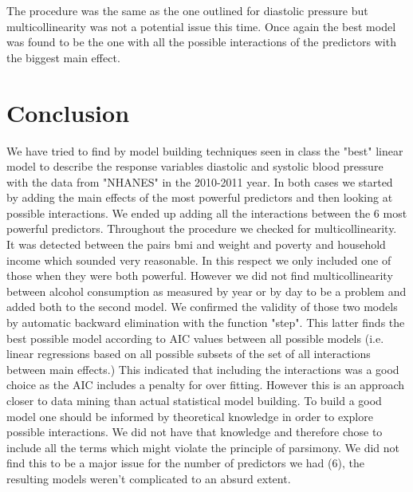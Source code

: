 \documentclass{article}\usepackage[]{graphicx}\usepackage[]{color}
\begin{document}
The procedure was the same as the one outlined for diastolic pressure but multicollinearity was not a potential issue this time. Once again the best model was found to be the one with all the possible interactions of the predictors with the biggest main effect.

\clearpage

\section*{Conclusion}

We have tried to find by model building techniques seen in class the "best" linear model to describe the response variables diastolic and systolic blood pressure with the data from "NHANES"  in the 2010-2011 year. In both cases we started by adding the main effects of the most powerful predictors and then looking at possible interactions. We ended up adding all the interactions between the 6 most powerful predictors. Throughout the procedure we checked for multicollinearity. It was detected between the pairs bmi and weight and poverty and household income which sounded very reasonable. In this respect we only included one of those when they were both powerful. However we did not find multicollinearity between alcohol consumption as measured by year or by day to be a problem and added both to the second model. We confirmed the validity of those two models by automatic backward elimination with the function "step". This latter finds the best possible model according to AIC values between all possible models (i.e. linear regressions based on all possible subsets of the set of all interactions between main effects.) This indicated that including the interactions was a good choice as the AIC includes a penalty for over fitting. However this is an approach closer to data mining than actual statistical model building. To build a good model one should be informed by theoretical knowledge in order to explore possible interactions. We did not have that knowledge and therefore chose to include all the terms which might violate the principle of parsimony. We did not find this to be a major issue for the number of predictors we had (6), the resulting models weren't complicated to an absurd extent.



\clearpage
\end{document}
